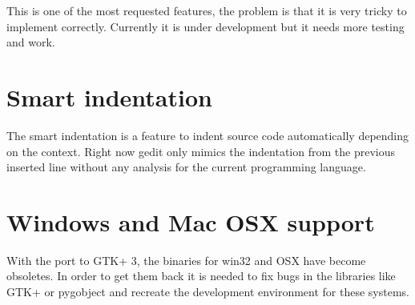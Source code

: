 This is one of the most requested features, the problem is that it is very tricky to implement correctly. Currently it is under development but it needs more testing and work.

\section{Smart indentation}

The smart indentation is a feature to indent source code automatically depending on the context. Right now gedit only mimics the indentation from the previous inserted line without any analysis for the current programming language.

\section{Windows and Mac OSX support}

With the port to GTK+ 3, the binaries for win32 and OSX have become obsoletes. In order to get them back it is needed to fix bugs in the libraries like GTK+ or pygobject and recreate the development environment for these systems.
